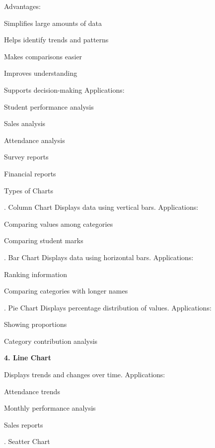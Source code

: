 \documentclass[10pt,a4paper]{article}
\begin{document}
\noindent Advantages:\par
\noindent\textbullet\; Simplifies large amounts of data\par
\noindent\textbullet\; Helps identify trends and patterns\par
\noindent\textbullet\; Makes comparisons easier\par
\noindent\textbullet\; Improves understanding\par
\noindent\textbullet\; Supports decision-making Applications:\par
\noindent\textbullet\; Student performance analysis\par
\noindent\textbullet\; Sales analysis\par
\noindent\textbullet\; Attendance analysis\par
\noindent\textbullet\; Survey reports\par
\noindent\textbullet\; Financial reports\par

\noindent Types of Charts\par
{}. Column Chart Displays data using vertical bars. Applications:\par
\noindent\textbullet\; Comparing values among categories\par
\noindent\textbullet\; Comparing student marks\par
{}. Bar Chart Displays data using horizontal bars. Applications:\par
\noindent\textbullet\; Ranking information\par
\noindent\textbullet\; Comparing categories with longer names\par
\clearpage
{}. Pie Chart Displays percentage distribution of values. Applications:\par
\noindent\textbullet\; Showing proportions\par
\noindent\textbullet\; Category contribution analysis\par
\medskip\noindent\textbf{4. Line Chart}\par

\noindent Displays trends and changes over time. Applications:\par
\noindent\textbullet\; Attendance trends\par
\noindent\textbullet\; Monthly performance analysis\par
\noindent\textbullet\; Sales reports\par
{}. Seatter Chart\par
\end{document}
